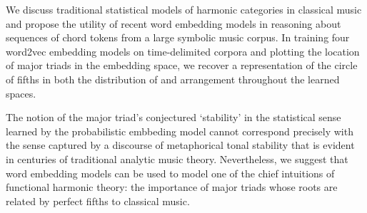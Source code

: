 
We discuss traditional statistical models of harmonic categories in classical music and propose the utility of recent word embedding models in reasoning about sequences of chord tokens from a large symbolic music corpus. In training four word2vec embedding models on time-delimited corpora and plotting the location of major triads in the embedding space, we recover a representation of the circle of fifths in both the distribution of and arrangement throughout the learned spaces.

The notion of the major triad's conjectured `stability' in the statistical sense learned by the probabilistic embbeding model cannot correspond precisely with the sense captured by a discourse of metaphorical tonal stability that is evident in centuries of traditional analytic music theory. Nevertheless, we suggest that word embedding models can be used to model one of the chief intuitions of functional harmonic theory: the importance of major triads whose roots are related by perfect fifths to classical music.